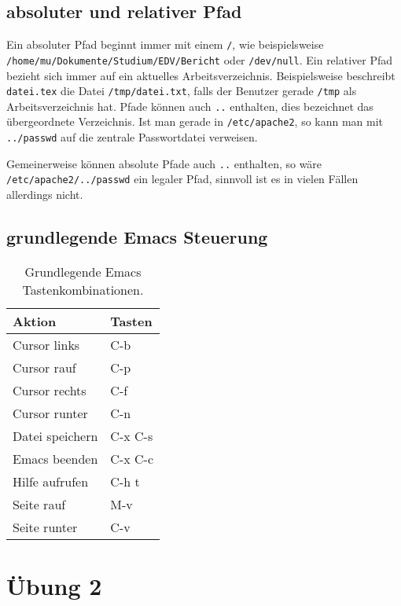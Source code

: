 \section{absoluter und relativer Pfad}

Ein absoluter Pfad beginnt immer mit einem \texttt{/}, wie beispielsweise \\ \texttt{/home/mu/Dokumente/Studium/EDV/Bericht} oder \texttt{/dev/null}. Ein relativer Pfad bezieht sich immer auf ein aktuelles Arbeitsverzeichnis. Beispielsweise beschreibt \texttt{datei.tex} die Datei \texttt{/tmp/datei.txt}, falls der Benutzer gerade \texttt{/tmp} als Arbeitsverzeichnis hat. Pfade können auch \texttt{..} enthalten, dies bezeichnet das übergeordnete Verzeichnis. Ist man gerade in \texttt{/etc/apache2}, so kann man mit \texttt{../passwd} auf die zentrale Passwortdatei verweisen.

Gemeinerweise können absolute Pfade auch \texttt{..} enthalten, so wäre \\
\texttt{/etc/apache2/../passwd} ein legaler Pfad, sinnvoll ist es in vielen Fällen allerdings nicht.

\section{grundlegende Emacs Steuerung}

\begin{table}[htb]
\begin{center}
\begin{tabular}{ll}
Aktion & Tasten \\
\hline
Cursor links & C-b \\
Cursor rauf & C-p \\
Cursor rechts & C-f \\
Cursor runter & C-n \\
Datei speichern & C-x C-s \\
Emacs beenden & C-x C-c \\
Hilfe aufrufen & C-h t \\
Seite rauf & M-v \\
Seite runter & C-v \\
\end{tabular}
\end{center}
\caption{Grundlegende Emacs Tastenkombinationen.}
\end{table}

\chapter{Übung 2}

